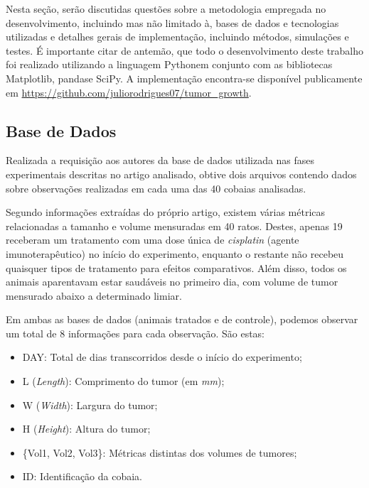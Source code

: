 \documentclass[12pt]{article}
\begin{document}
Nesta seção, serão discutidas questões sobre a metodologia empregada no desenvolvimento, incluindo mas não limitado à, bases de dados e tecnologias utilizadas e detalhes gerais de implementação, incluindo métodos, simulações e testes. É importante citar de antemão, que todo o desenvolvimento deste trabalho foi realizado utilizando a linguagem Python\footnotemark \hspace{0.1cm}em conjunto com as bibliotecas Matplotlib\footnotemark, pandas\footnotemark e SciPy\footnotemark. A implementação encontra-se disponível publicamente em \url{https://github.com/juliorodrigues07/tumor_growth}.


\subsection{Base de Dados} \label{subsec:1}

Realizada a requisição aos autores da base de dados utilizada nas fases experimentais descritas no artigo analisado, obtive dois arquivos contendo dados sobre observações realizadas em cada uma das 40 cobaias analisadas.

Segundo informações extraídas do próprio artigo, existem várias métricas relacionadas a tamanho e volume mensuradas em 40 ratos. Destes, apenas 19 receberam um tratamento com uma dose única de \emph{cisplatin} (agente imunoterapêutico) no início do experimento, enquanto o restante não recebeu quaisquer tipos de tratamento para efeitos comparativos. Além disso, todos os animais aparentavam estar saudáveis no primeiro dia, com volume de tumor mensurado abaixo a determinado limiar.

Em ambas as bases de dados (animais tratados e de controle), podemos observar um total de 8 informações para cada observação. São estas:

\begin{itemize}
    \setlength{\itemsep}{10pt}
    \item DAY: Total de dias transcorridos desde o início do experimento;
    \item L (\emph{Length}): Comprimento do tumor (em \emph{mm});
    \item W (\emph{Width}): Largura do tumor;
    \item H (\emph{Height}): Altura do tumor;
    \item \{Vol1, Vol2, Vol3\footnotemark\}: Métricas distintas dos volumes de tumores;
    \item ID: Identificação da cobaia.
\end{itemize}
\end{document}
